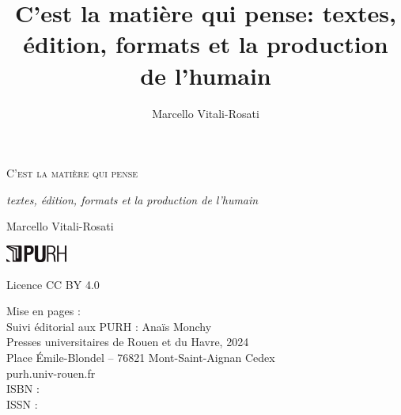 \documentclass[12pt]{book}
\title{C'est la matière qui pense: textes, édition, formats et la
production de l'humain}
\author{Marcello Vitali-Rosati}
\date{}
\begin{document}
\thispagestyle{empty}
\vspace*{1.6in}
\begin{center}
\Huge \textsc{C'est la matière qui pense}

	\vspace{0.2in}
\Large
	\textit{textes, édition, formats et la
	production de l'humain}

\large
	\vspace{0.4in}
Marcello Vitali-Rosati

	\vspace*{\fill}

	\includegraphics[width=2cm]{logo_PURH_seul_noir.eps}
\end{center}
\newpage

\thispagestyle{empty}
\vspace*{\fill}
\footnotesize

\noindent Licence CC BY 4.0
\vspace{1cm}

\noindent Mise en pages : \\ 
Suivi éditorial aux PURH : Anaïs Monchy\\
Presses universitaires de Rouen et du Havre, 2024\\
Place Émile-Blondel – 76821 Mont-Saint-Aignan Cedex\\
purh.univ-rouen.fr\\
ISBN : \\
ISSN : \\

\newpage
\normalsize
\thispagestyle{empty}



\tableofcontents
\end{document}
